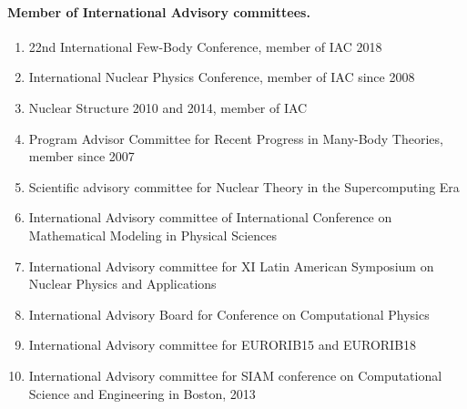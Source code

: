 \documentclass[a4wide,10pt]{article}
\begin{document}
\paragraph{Member of International Advisory committees.}
\begin{enumerate}
\item 22nd International Few-Body Conference, member of IAC 2018

\item International Nuclear Physics Conference, member of IAC since 2008

\item Nuclear Structure 2010 and 2014, member of IAC

\item Program Advisor Committee for Recent Progress in Many-Body Theories, member since 2007

\item Scientific advisory committee for Nuclear Theory in the Supercomputing Era 

\item International Advisory committee of International Conference on Mathematical Modeling in Physical Sciences

\item International Advisory committee for XI Latin American Symposium on Nuclear Physics and Applications 

\item International Advisory Board for Conference on Computational Physics

\item International Advisory committee for EURORIB15 and EURORIB18

\item International Advisory committee for SIAM conference on Computational Science and Engineering in Boston, 2013
\end{enumerate}

\end{document}
